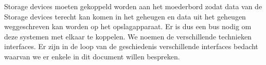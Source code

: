 Storage devices moeten gekoppeld worden aan het moederbord zodat data van de Storage devices terecht kan komen in het geheugen en data uit het geheugen weggeschreven kan worden op het opslagapparaat. Er is dus een bus nodig om deze systemen met elkaar te koppelen. We noemen de verschillende technieken interfaces. Er zijn in de loop van de geschiedenis verschillende interfaces bedacht waarvan we er enkele in dit document willen bespreken.

